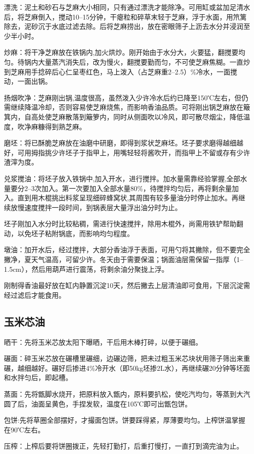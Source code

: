 \documentclass{ctexbook}
\begin{document}
漂洗：泥土和砂石与芝麻大小相同，只有通过漂洗才能除净。可用缸或盆加足清水后，将芝麻倒入，搅动10--15分钟，干瘪粒和碎草末轻于芝麻，浮于水面，用笊篱除去，泥砂沉于水底过滤去除。后将芝麻捞出，放在密眼筛子上沥去水分并浸润至少半小时。

炒麻：将干净芝麻放在铁锅内,加火烘炒。刚开始由于水分大，火要猛，翻搅要均匀。待锅内大量蒸汽消失后，改为慢火，翻搅要勤而匀，不可使芝麻焦糊。一直炒到芝麻用手捻碎后心仁呈枣红色，马上泼入（占芝麻重2--2.5）\%冷水，一面搅动，一面出锅。

扬烟吹净：芝麻刚出锅,温度很高，虽然泼入少许冷水后约已降至150℃左右，但仍需继续降温冷却，否则容易使芝麻烧焦，而影响香油品质。可将刚出锅芝麻放在簸箕内，自高处使芝麻散落到簸箩内，同时从侧面吹以冷风，即可散尽烟尘，降低温度，吹净麻糠得到熟芝麻。

磨坯：将已酥脆芝麻放在油磨中研磨，即得到浆状芝麻坯。坯子要求磨得越细越好，可用拇指挑少许坯子于指甲上，用嘴轻轻将酱吹开，而指甲上不留或存有少许渣滓为度。

兑浆搅油：将坯子放入铁锅中,加入开水，进行搅拌。加水量需靠经验掌握,全部水量要分2--3次加入。第一次要加入全部水量80\%，待搅拌均匀后，再将剩余量加入。直到用木棍挑出料浆呈现细碎蜂窝状,其周围有较多量油分时停止加水。再继续放慢速度搅拌一段时间，到锅表层大量浮出油分时为止。

坯子刚加入水分时比较粘稠，需进行快速搅拌，除用木棍外，尚需用铁铲帮助翻动，以免坯子粘附锅底，而影响均匀程度。

墩油：加开水后，经过搅拌，大部分香油浮于表面，可用勺将其撇除，但不要完全撇净，夏天气温高，可留少许。冬天由于需要保温；锅面油层需保留一指厚（1--1.5cm），然后用葫芦进行震荡，将剩余油分聚拢上浮。

刚制得香油最好放在缸内静置沉淀10天，然后撇去上层清油即可食用，下层沉淀需经过滤后才能食用。
\subsection{玉米芯油}
晒干：先将玉米芯放太阳下曝晒，干后用木棒打碎，以便于碾细。

碾面：碎玉米芯放在碾槽里碾细，边碾边筛，把未过粗玉米芯块状用筛子筛出来重碾，越细越好。碾好后掺进4\%冷开水（即50kg坯掺2L水），再继续碾20分钟等坯面和水拌匀后，即起槽。

蒸面：先将甑脚水烧开，把原料放入甑内，原料要扒松，使吃汽均匀，等蒸到大汽圆了后，油面呈黄色，手捏发软，温度在105℃即可出甑包饼。

包饼:先将草圈全部摆好，才撮面包饼。饼要踩得紧，厚薄要均匀。上榨饼温掌握在90℃左右。

压榨：上榨后要将饼圈拨正，先轻打勤打，后重打慢打，一直打到滴完油为止。
\end{document}
